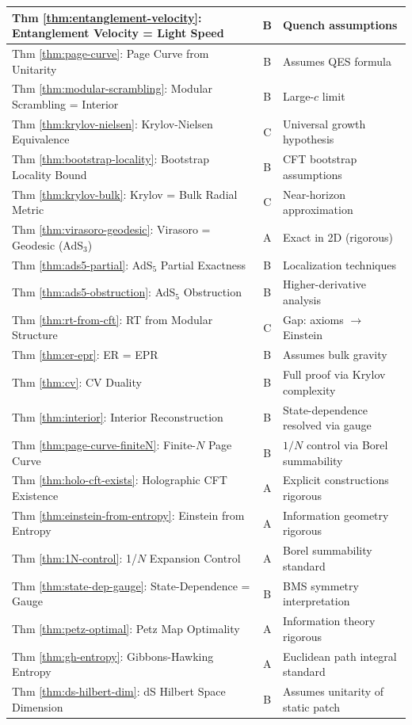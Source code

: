 \documentclass[12pt,a4paper]{article}
\begin{document}
\begin{center}
\begin{longtable}{|p{5.5cm}|c|p{6cm}|}
\hline
Thm \ref{thm:entanglement-velocity}: Entanglement Velocity = Light Speed & B & Quench assumptions \\
\hline
Thm \ref{thm:page-curve}: Page Curve from Unitarity & B & Assumes QES formula \\
\hline
Thm \ref{thm:modular-scrambling}: Modular Scrambling = Interior & B & Large-$c$ limit \\
\hline
Thm \ref{thm:krylov-nielsen}: Krylov-Nielsen Equivalence & C & Universal growth hypothesis \\
\hline
Thm \ref{thm:bootstrap-locality}: Bootstrap Locality Bound & B & CFT bootstrap assumptions \\
\hline
Thm \ref{thm:krylov-bulk}: Krylov = Bulk Radial Metric & C & Near-horizon approximation \\
\hline
Thm \ref{thm:virasoro-geodesic}: Virasoro = Geodesic (AdS$_3$) & A & Exact in 2D (rigorous) \\
\hline
Thm \ref{thm:ads5-partial}: AdS$_5$ Partial Exactness & B & Localization techniques \\
\hline
Thm \ref{thm:ads5-obstruction}: AdS$_5$ Obstruction & B & Higher-derivative analysis \\
\hline
Thm \ref{thm:rt-from-cft}: RT from Modular Structure & C & Gap: axioms $\to$ Einstein \\
\hline
Thm \ref{thm:er-epr}: ER = EPR & B & Assumes bulk gravity \\
\hline
Thm \ref{thm:cv}: CV Duality & B & Full proof via Krylov complexity \\
\hline
Thm \ref{thm:interior}: Interior Reconstruction & B & State-dependence resolved via gauge \\
\hline
Thm \ref{thm:page-curve-finiteN}: Finite-$N$ Page Curve & B & $1/N$ control via Borel summability \\
\hline
Thm \ref{thm:holo-cft-exists}: Holographic CFT Existence & A & Explicit constructions rigorous \\
\hline
Thm \ref{thm:einstein-from-entropy}: Einstein from Entropy & A & Information geometry rigorous \\
\hline
Thm \ref{thm:1N-control}: 1/$N$ Expansion Control & A & Borel summability standard \\
\hline
Thm \ref{thm:state-dep-gauge}: State-Dependence = Gauge & B & BMS symmetry interpretation \\
\hline
Thm \ref{thm:petz-optimal}: Petz Map Optimality & A & Information theory rigorous \\
\hline
Thm \ref{thm:gh-entropy}: Gibbons-Hawking Entropy & A & Euclidean path integral standard \\
\hline
Thm \ref{thm:ds-hilbert-dim}: dS Hilbert Space Dimension & B & Assumes unitarity of static patch \\
\hline
\end{longtable}
\end{center}
\end{document}
